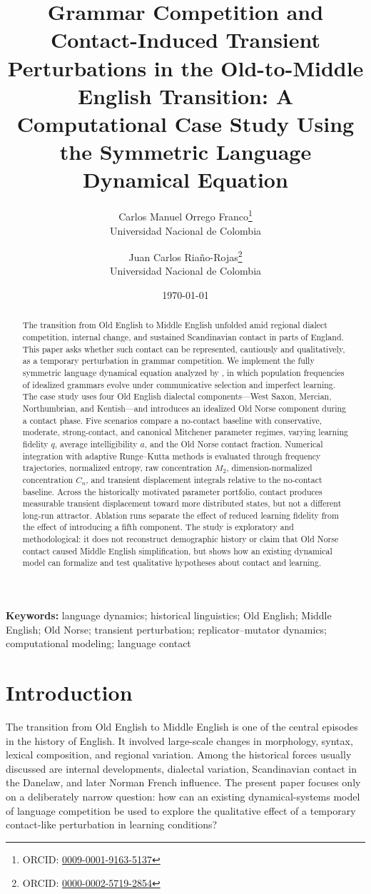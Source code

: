 \documentclass[11pt]{article}
\title{Grammar Competition and Contact-Induced Transient Perturbations in the Old-to-Middle English Transition: A Computational Case Study Using the Symmetric Language Dynamical Equation}
\author{
Carlos Manuel Orrego Franco\thanks{ORCID: \href{https://orcid.org/0009-0001-9163-5137}{0009-0001-9163-5137}}\\
Universidad Nacional de Colombia
\and
Juan Carlos Riaño-Rojas\thanks{ORCID: \href{https://orcid.org/0000-0002-5719-2854}{0000-0002-5719-2854}}\\
Universidad Nacional de Colombia
}
\date{\today}
\providecommand{\keywords}[1]{\textbf{Keywords:} #1}
\begin{document}
\maketitle

\begin{abstract}
The transition from Old English to Middle English unfolded amid regional dialect competition, internal change, and sustained Scandinavian contact in parts of England. This paper asks whether such contact can be represented, cautiously and qualitatively, as a temporary perturbation in grammar competition. We implement the fully symmetric language dynamical equation analyzed by \citet{mitchener2003bifurcation}, in which population frequencies of idealized grammars evolve under communicative selection and imperfect learning. The case study uses four Old English dialectal components---West Saxon, Mercian, Northumbrian, and Kentish---and introduces an idealized Old Norse component during a contact phase. Five scenarios compare a no-contact baseline with conservative, moderate, strong-contact, and canonical Mitchener parameter regimes, varying learning fidelity $q$, average intelligibility $a$, and the Old Norse contact fraction. Numerical integration with adaptive Runge--Kutta methods is evaluated through frequency trajectories, normalized entropy, raw concentration $M_2$, dimension-normalized concentration $C_n$, and transient displacement integrals relative to the no-contact baseline. Across the historically motivated parameter portfolio, contact produces measurable transient displacement toward more distributed states, but not a different long-run attractor. Ablation runs separate the effect of reduced learning fidelity from the effect of introducing a fifth component. The study is exploratory and methodological: it does not reconstruct demographic history or claim that Old Norse contact caused Middle English simplification, but shows how an existing dynamical model can formalize and test qualitative hypotheses about contact and learning.
\end{abstract}

\keywords{language dynamics; historical linguistics; Old English; Middle English; Old Norse; transient perturbation; replicator--mutator dynamics; computational modeling; language contact}

\section{Introduction}

The transition from Old English to Middle English is one of the central episodes in the history of English. It involved large-scale changes in morphology, syntax, lexical composition, and regional variation. Among the historical forces usually discussed are internal developments, dialectal variation, Scandinavian contact in the Danelaw, and later Norman French influence. The present paper focuses only on a deliberately narrow question: how can an existing dynamical-systems model of language competition be used to explore the qualitative effect of a temporary contact-like perturbation in learning conditions?
\end{document}
